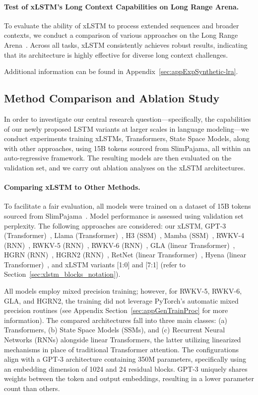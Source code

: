 \paragraph{Test of xLSTM's Long Context Capabilities on Long Range Arena.} To evaluate the ability of xLSTM to process extended sequences and broader contexts, we conduct a comparison of various approaches on the Long Range Arena~\citep{Tay:21}. Across all tasks, xLSTM consistently achieves robust results, indicating that its architecture is highly effective for diverse long context challenges.

Additional information can be found in Appendix~\ref{sec:appExpSynthetic-lra}.

\subsection{Method Comparison and Ablation Study}
\label{sec:ExpComparison}

In order to investigate our central research question—specifically, the capabilities of our newly proposed LSTM variants at larger scales in language modeling—we conduct experiments training xLSTMs, Transformers, State Space Models, along with other approaches, using 15B tokens sourced from SlimPajama, all within an auto-regressive framework. The resulting models are then evaluated on the validation set, and we carry out ablation analyses on the xLSTM architectures.

\paragraph{Comparing xLSTM to Other Methods.} To facilitate a fair evaluation, all models were trained on a dataset of 15B tokens sourced from SlimPajama~\citep{Soboleva:23}. Model performance is assessed using validation set perplexity. The following approaches are considered: our xLSTM, GPT-3 (Transformer)~\citep{Brown:20short}, Llama (Transformer)~\citep{Touvron:23arxiv}, H3 (SSM)~\citep{Fu:23}, Mamba (SSM)~\citep{Gu:24arxiv}, RWKV-4 (RNN)~\citep{Peng:23arxivshort}, RWKV-5 (RNN)~\citep{Peng:24arxivshort}, RWKV-6 (RNN)~\citep{Peng:24arxivshort}, GLA (linear Transformer)~\citep{Yang:23arxiv}, HGRN (RNN)~\citep{Qin:23}, HGRN2 (RNN)~\citep{Qin:24arxiv}, RetNet (linear Transformer)~\citep{Sun:23arxiv}, Hyena (linear Transformer)~\citep{Poli:23}, and xLSTM variants [1:0] and [7:1] (refer to Section~\ref{sec:xlstm_blocks_notation}). 

All models employ mixed precision training; however, for RWKV-5, RWKV-6, GLA, and HGRN2, the training did not leverage PyTorch’s automatic mixed precision routines (see Appendix Section~\ref{sec:appGenTrainProc} for more information). The compared architectures fall into three main classes: (a) Transformers, (b) State Space Models (SSMs), and (c) Recurrent Neural Networks (RNNs) alongside linear Transformers, the latter utilizing linearized mechanisms in place of traditional Transformer attention. The configurations align with a GPT-3 architecture containing 350M parameters, specifically using an embedding dimension of 1024 and 24 residual blocks. GPT-3 uniquely shares weights between the token and output embeddings, resulting in a lower parameter count than others. 

